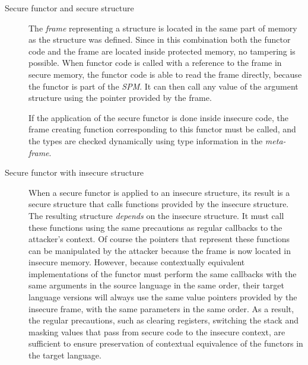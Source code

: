 \begin{description}
\item[Secure functor and secure structure] 
The \emph{frame} representing a structure is located in the same part of memory as the structure was defined.
Since in this combination both the functor code and the frame are located inside protected memory, no tampering is possible.
When functor code is called with a reference to the frame in secure memory, the functor code is able to read the frame directly, because the functor is part of the \emph{SPM}. It can then call any value of the argument structure using the pointer provided by the frame.

If the application of the secure functor is done inside insecure code, the frame creating function corresponding to this functor must be called, and the types are checked dynamically using type information in the \emph{meta-frame}.
\item[Secure functor with insecure structure]
When a secure functor is applied to an insecure structure, its result is a secure structure that calls functions provided by the insecure structure.
The resulting structure \emph{depends} on the insecure structure.
It must call these functions using the same precautions as regular callbacks to the attacker's context.
Of course the pointers that represent these functions can be manipulated by the attacker because the frame is now located in insecure memory.
However, because contextually equivalent implementations of the functor must perform the same callbacks with the same arguments in the source language in the same order, their target language versions will always use the same value pointers provided by the insecure frame, with the same parameters in the same order.
As a result, the regular precautions, such as clearing registers, switching the stack and masking values that pass from secure code to the insecure context, are sufficient to ensure preservation of contextual equivalence of the functors in the target language.


\end{description}
